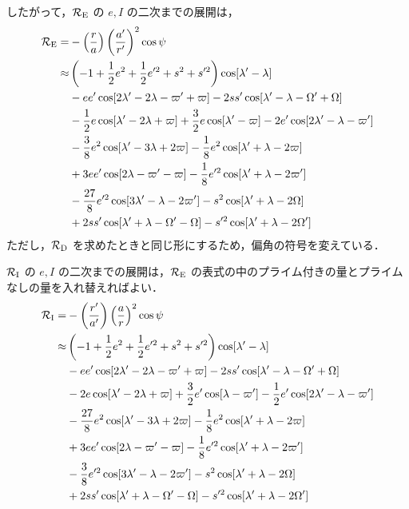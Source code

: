 \documentclass[11pt,a4paper,oneside,onecolumn]{jreport}
\begin{document}
したがって，${\cal R}_{\rm E}$ の $e, I$ の二次までの展開は，
\begin{equation}
\begin{split}
{\cal R}_{\rm E} = & - \left( \frac{r}{a} \right) \left( \frac{a'}{r'} \right)^2 \cos \psi \\
\approx & \left( -1 + \frac{1}{2} e^2 + \frac{1}{2} e'^2 + s^2 + s'^2 \right) \cos [\lambda' - \lambda] \\
& - e e' \cos [2 \lambda' - 2 \lambda - \varpi' + \varpi] - 2 s s' \cos [\lambda' - \lambda - \Omega' + \Omega] \\
& - \frac{1}{2} e \cos [\lambda' -2 \lambda + \varpi] + \frac{3}{2} e \cos [\lambda' - \varpi] - 2 e' \cos [2 \lambda' - \lambda - \varpi'] \\
& - \frac{3}{8} e^2 \cos [\lambda' - 3 \lambda + 2 \varpi] - \frac{1}{8} e^2 \cos [\lambda' + \lambda - 2 \varpi] \\
& + 3 e e' \cos [2 \lambda - \varpi' - \varpi] - \frac{1}{8} e'^2 \cos [\lambda' + \lambda - 2 \varpi'] \\
& - \frac{27}{8} e'^2 \cos [3 \lambda' - \lambda - 2 \varpi'] - s^2 \cos [\lambda' + \lambda - 2 \Omega] \\
& + 2 s s' \cos [\lambda' + \lambda - \Omega' - \Omega] - s'^2 \cos [\lambda' + \lambda - 2 \Omega']
\end{split} \label{eq:cal_RE(012)}
\end{equation}
ただし，${\cal R}_{\rm D}$ を求めたときと同じ形にするため，偏角の符号を変えている．

${\cal R}_{\rm I}$ の $e, I$ の二次までの展開は，${\cal R}_{\rm E}$ の表式の中のプライム付きの量とプライムなしの量を入れ替えればよい．
\begin{equation}
\begin{split}
{\cal R}_{\rm I} = & - \left( \frac{r'}{a'} \right) \left( \frac{a}{r} \right)^2 \cos \psi \\
\approx & \left( -1 + \frac{1}{2} e^2 + \frac{1}{2} e'^2 + s^2 + s'^2 \right) \cos [\lambda' - \lambda] \\
& - e e' \cos [2 \lambda' - 2 \lambda - \varpi' + \varpi] - 2 s s' \cos [\lambda' - \lambda - \Omega' + \Omega] \\
& -2 e \cos [\lambda' -2 \lambda + \varpi] + \frac{3}{2} e' \cos [\lambda - \varpi'] - \frac{1}{2} e' \cos [2 \lambda' - \lambda - \varpi'] \\
& - \frac{27}{8} e^2 \cos [\lambda' - 3 \lambda + 2 \varpi] - \frac{1}{8} e^2 \cos [\lambda' + \lambda - 2 \varpi] \\
& + 3 e e' \cos [2 \lambda - \varpi' - \varpi] - \frac{1}{8} e'^2 \cos [\lambda' + \lambda - 2 \varpi'] \\
& - \frac{3}{8} e'^2 \cos [3 \lambda' - \lambda - 2 \varpi'] - s^2 \cos [\lambda' + \lambda - 2 \Omega] \\
& + 2 s s' \cos [\lambda' + \lambda - \Omega' - \Omega] - s'^2 \cos [\lambda' + \lambda - 2 \Omega']
\end{split}
\end{equation}
\end{document}
